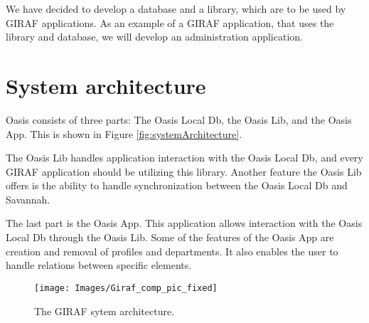 We have decided to develop a database and a library, which are to be used by GIRAF applications.
As an example of a GIRAF application, that uses the library and database, we will develop an administration application.

\section{System architecture}
Oasis consists of three parts: The Oasis Local Db, the Oasis Lib, and the Oasis App. This is shown in Figure \vref{fig:systemArchitecture}.

The Oasis Lib handles application interaction with the Oasis Local Db, and every GIRAF application should be utilizing this library.
Another feature the Oasis Lib offers is the ability to handle synchronization between the Oasis Local Db and Savannah.

The last part is the Oasis App.
This application allows interaction with the Oasis Local Db through the Oasis Lib. 
Some of the features of the Oasis App are creation and removal of profiles and departments.
It also enables the user to handle relations between specific elements.

\begin{figure}
	\centering
		\texttt{[image: Images/Giraf\_comp\_pic\_fixed]}
	\caption{The GIRAF sytem architecture.}
	\label{fig:systemArchitecture}
\end{figure}